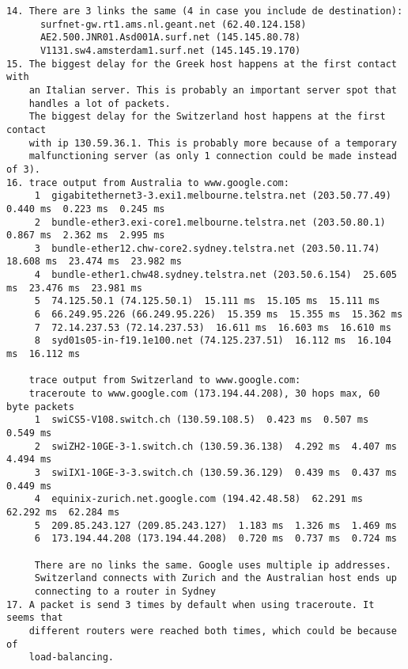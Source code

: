 \documentclass[12pt]{article} %
\begin{document}
\begin{verbatim}
14. There are 3 links the same (4 in case you include de destination):
      surfnet-gw.rt1.ams.nl.geant.net (62.40.124.158)  
      AE2.500.JNR01.Asd001A.surf.net (145.145.80.78)
      V1131.sw4.amsterdam1.surf.net (145.145.19.170)
15. The biggest delay for the Greek host happens at the first contact with
    an Italian server. This is probably an important server spot that
    handles a lot of packets.
    The biggest delay for the Switzerland host happens at the first contact
    with ip 130.59.36.1. This is probably more because of a temporary
    malfunctioning server (as only 1 connection could be made instead of 3).
16. trace output from Australia to www.google.com:
     1  gigabitethernet3-3.exi1.melbourne.telstra.net (203.50.77.49)  0.440 ms  0.223 ms  0.245 ms
     2  bundle-ether3.exi-core1.melbourne.telstra.net (203.50.80.1)  0.867 ms  2.362 ms  2.995 ms
     3  bundle-ether12.chw-core2.sydney.telstra.net (203.50.11.74)  18.608 ms  23.474 ms  23.982 ms
     4  bundle-ether1.chw48.sydney.telstra.net (203.50.6.154)  25.605 ms  23.476 ms  23.981 ms
     5  74.125.50.1 (74.125.50.1)  15.111 ms  15.105 ms  15.111 ms
     6  66.249.95.226 (66.249.95.226)  15.359 ms  15.355 ms  15.362 ms
     7  72.14.237.53 (72.14.237.53)  16.611 ms  16.603 ms  16.610 ms
     8  syd01s05-in-f19.1e100.net (74.125.237.51)  16.112 ms  16.104 ms  16.112 ms
   
    trace output from Switzerland to www.google.com:
    traceroute to www.google.com (173.194.44.208), 30 hops max, 60 byte packets
     1  swiCS5-V108.switch.ch (130.59.108.5)  0.423 ms  0.507 ms  0.549 ms
     2  swiZH2-10GE-3-1.switch.ch (130.59.36.138)  4.292 ms  4.407 ms  4.494 ms
     3  swiIX1-10GE-3-3.switch.ch (130.59.36.129)  0.439 ms  0.437 ms  0.449 ms
     4  equinix-zurich.net.google.com (194.42.48.58)  62.291 ms  62.292 ms  62.284 ms
     5  209.85.243.127 (209.85.243.127)  1.183 ms  1.326 ms  1.469 ms
     6  173.194.44.208 (173.194.44.208)  0.720 ms  0.737 ms  0.724 ms
    
     There are no links the same. Google uses multiple ip addresses.
     Switzerland connects with Zurich and the Australian host ends up
     connecting to a router in Sydney
17. A packet is send 3 times by default when using traceroute. It seems that
    different routers were reached both times, which could be because of
    load-balancing.
\end{verbatim}
\end{document}
